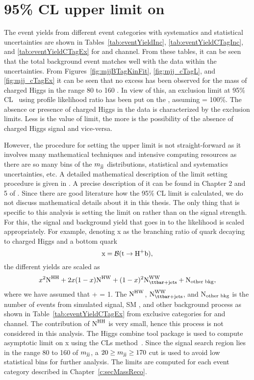 
\section{95\% CL upper limit on \brThb} 
\label{s:secLimit}
The event yields from different event categories with systematics and statistical
uncertainties are shown in Tables~\ref{tab:eventYieldInc}, \ref{tab:eventYieldCTagInc}, 
and \ref{tab:eventYieldCTagEx} for \mujets and \ejets channel. From these tables, it can 
be seen that the total background event matches well with the data within the uncertainties. 
From Figures~\ref{fig:mjjBTagKinFit}, \ref{fig:mjj_cTagL}, and \ref{fig:mjj_cTagEx} it can
be seen that no excess has been observed for the mass of charged Higgs in the range
80 to 160 \GeV. In view of this, an exclusion limit at 95\% CL~\cite{Junk:1999kv} 
using profile likelihood ratio has been put on the \brThb, assuming \brHcs = 100\%.
The absence or presence of charged Higgs in the data is characterized by the exclusion limits. 
Less is the value of limit, the more is the possibility of the absence of charged Higgs signal 
and vice-versa.

However, the procedure for setting the upper limit is not straight-forward as it involves many 
mathematical techniques and intensive computing resources as there are so many bins of the $\mjj$ 
distributions, statistical and systematics uncertainties, etc. A detailed mathematical description
of the limit setting procedure is given in \cite{Cowan:2010js}. A precise description of it can be 
found in Chapter 2 and 5 of \cite{ATLAS:2011tau}. Since there are good literature how the 95\%
CL limit is calculated, we do not discuss mathematical details about it in this thesis. The only thing
that is specific to this analysis is setting the limit on \brThb rather than on the signal strength.
For this, the signal and background yield that goes in to the likelihood is scaled appropriately.
For example, denoting x as the branching ratio of \PQt quark decaying to charged Higgs and a bottom 
quark
\begin{equation}
\rm{x} = \brThb ,
\end{equation}
the different yields are scaled as
\begin{equation}
x^2\rm{N}^{\rm{HH}} + 2x(1-x)\rm{N}^{\rm{HW}} + (1-x)^{2}\rm{N}^{\rm{WW}}_{\ttjets} + \rm{N}_{\rm{other bkg}} ,
\label{eq:deltaN}
\end{equation}
where we have assumed that \brThb + \brTwb = 1. The $\rm{N}^{\rm{HW}}$, $\rm{N}^{\rm{WW}}_{\ttjets}$, 
and $\rm{N}_{\rm{other bkg}}$ is the number of events from 
simulated signal, SM \ttjets, and other background process as shown in Table~\ref{tab:eventYieldCTagEx}
from exclusive categories for \mujets and \ejets channel.
The contribution of $\rm{N}^{\rm{HH}}$ is very small, hence this process is not considered in this
analysis. The Higgs combine tool package is used to compute asymptotic limit on \rm{x} using the 
CLs method~\cite{Junk:1999kv}. Since the signal search region lies in the range 80 to 160 \GeV of 
$\mjj$, a $20 \geq \mjj \geq 170$ cut is used to avoid low statistical bins for further 
analysis. The limits are computed for each event category described in Chapter~\ref{c:secMassReco}. 



